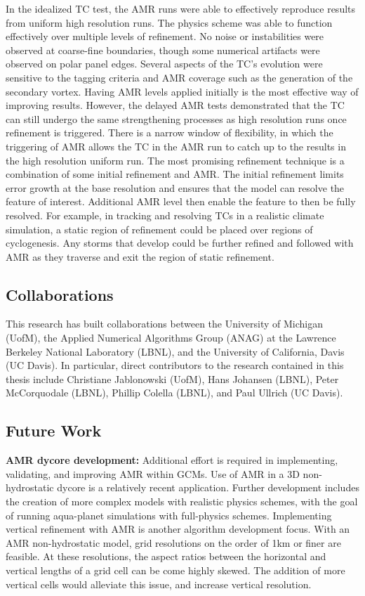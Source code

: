 In the idealized TC test, the AMR runs were able to effectively reproduce results from uniform high resolution runs.
The physics scheme was able to function effectively over multiple levels of refinement. No noise
or instabilities were observed at coarse-fine boundaries, though some
 numerical artifacts were observed on polar panel edges. 
Several aspects of the TC's evolution were
sensitive to the tagging criteria and AMR coverage such as the generation of the secondary vortex.
Having  AMR levels applied initially is the most effective way of improving results.
However, the delayed AMR tests demonstrated that the TC can still 
undergo the same strengthening processes as high resolution runs once refinement is triggered.
There is a narrow window of flexibility, in which the triggering of AMR allows the TC in the AMR 
run to catch up to the results in the high resolution uniform run.
The most promising refinement technique is a combination of some initial 
refinement and AMR. The initial refinement limits error growth at the 
base resolution and ensures that the model can resolve the feature of interest. 
Additional AMR level then enable the feature to then be fully resolved.
For example, in tracking and resolving TCs in a realistic climate simulation, 
a static region of refinement
could be placed over regions of cyclogenesis. Any storms that
develop could be further refined and followed with AMR as they traverse
and exit the region of static refinement.


\subsection{Collaborations}
This research has built collaborations between the University of Michigan (UofM), the 
Applied Numerical Algorithms Group (ANAG) at the Lawrence Berkeley National Laboratory (LBNL), and
the University of California, Davis (UC Davis). In particular, direct contributors to 
the research contained in this thesis include 
Christiane Jablonowski (UofM), Hans Johansen (LBNL), 
Peter McCorquodale (LBNL), Phillip Colella (LBNL), and Paul Ullrich (UC Davis).

\subsection{Future Work}

\textbf{AMR dycore development:}
Additional effort is required in implementing, validating, and improving AMR within GCMs.
Use of AMR in a 3D non-hydrostatic dycore is a relatively recent application. 
Further development includes the creation
of more complex models with realistic physics schemes, with
the goal of running aqua-planet simulations with full-physics schemes. 
Implementing vertical refinement with AMR is another algorithm development focus.
With an AMR non-hydrostatic model, grid resolutions on the order of 1km or finer are feasible.
At these resolutions, the aspect ratios between the horizontal and vertical lengths of a grid cell 
can be come highly skewed.  The addition of more vertical cells would alleviate this issue, and 
increase vertical resolution. 

